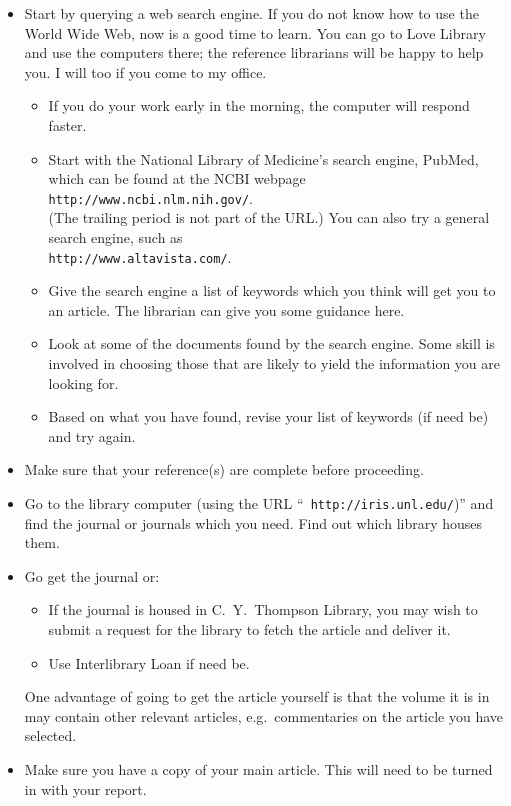 \begin{itemize}
\item Start by querying a web search engine.  If you do not know how to
use the World Wide Web, now is a good time to learn.  You can go to Love
Library and use the computers there; the reference librarians will be happy
to help you.  I will too if you come to my office.
      \begin{itemize}
      \item If you do your work early in the morning, the computer will
            respond faster.
      \item Start with the National Library of Medicine's search engine, PubMed,
            which can be found at the NCBI webpage\\
            {\tt http://www.ncbi.nlm.nih.gov/}.\\
            (The trailing period is not part of the URL.)
            You can also try a general search engine, such as \\
            {\tt http://www.altavista.com/}.
      \item Give the search engine a list of keywords which you think will
            get you to an article.  The librarian can give you some guidance
            here.
      \item Look at some of the documents found by the search engine.  Some
            skill is involved in choosing those that are likely to yield
            the information you are looking for.
      \item Based on what you have found, revise your list of keywords (if
            need be) and try again.
      \end{itemize}
\item Make sure that your reference(s) are complete before proceeding.
\item Go to the library computer (using the URL ``{\tt
http://iris.unl.edu/})''
      and find the journal or journals which you need.  Find out which
library
      houses them.
\item Go get the journal or:
      \begin{itemize}
      \item If the journal is housed in C.\ Y.\ Thompson Library, you may
wish
            to submit a request for the library to fetch the article and
deliver
            it.
      \item Use Interlibrary Loan if need be.
      \end{itemize}
      One advantage of going to get the article yourself is that the volume
it
      is in may contain other relevant articles, e.g.\ commentaries on the
      article you have selected.
\item Make sure you have a copy of your main article.  This will need to be
      turned in with your report.
\end{itemize}

